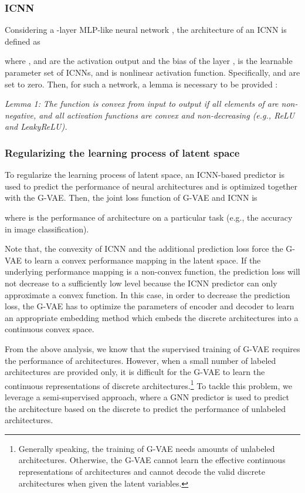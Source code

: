 \documentclass[10pt,twocolumn,letterpaper]{article}
\begin{document}
\subsubsection{ICNN}
Considering a -layer MLP-like neural network , the architecture of an ICNN is defined as
 
where ,  and  are the activation output and the bias of the layer ,  is the learnable parameter set of ICNNs, and  is nonlinear activation function. Specifically,  and  are set to zero. Then, for such a network, a lemma is necessary to be provided \cite{amos2017input, chen2018optimal}:

\emph{Lemma 1:} \emph{The function  is convex from input to output if all elements of  are non-negative, and all activation functions  are convex and non-decreasing (e.g., ReLU and LeakyReLU).}

\subsubsection{Regularizing the learning process of latent space}
To regularize the learning process of latent space, an ICNN-based predictor is used to predict the performance of neural architectures and is optimized together with the G-VAE. Then, the joint loss function of G-VAE and ICNN is 

where  is the performance of architecture  on a particular task (e.g., the accuracy in image classification). 

Note that, the convexity of ICNN and the additional prediction loss  force the G-VAE to learn a convex performance mapping in the latent space. If the underlying performance mapping is a non-convex function, the prediction loss will not decrease to a sufficiently low level because the ICNN predictor can only approximate a convex function. In this case, in order to decrease the prediction loss, the G-VAE has to optimize the parameters of encoder and decoder to learn an appropriate embedding method which embeds the discrete architectures into a continuous convex space. 

From the above analysis, we know that the supervised training of G-VAE requires the performance of architectures. However, when a small number of labeled architectures are provided only, it is difficult for the G-VAE to learn the continuous representations of discrete architectures.\footnote{Generally speaking, the training of G-VAE needs amounts of unlabeled architectures. Otherwise, the G-VAE cannot learn the effective continuous representations of architectures and cannot decode the valid discrete architectures when given the latent variables.} To tackle this problem, we leverage a semi-supervised approach, where a GNN predictor  is used to predict the architecture based on the discrete  to predict the performance of unlabeled architectures. 
\end{document}
